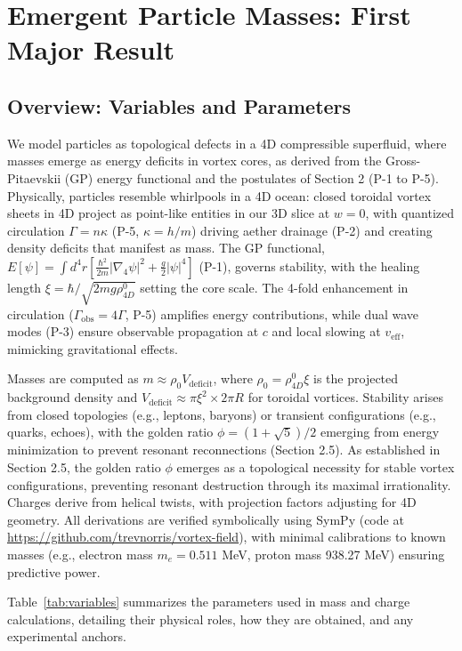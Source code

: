 \section{Emergent Particle Masses: First Major Result}

\subsection{Overview: Variables and Parameters}

We model particles as topological defects in a 4D compressible superfluid, where masses emerge as energy deficits in vortex cores, as derived from the Gross-Pitaevskii (GP) energy functional and the postulates of Section 2 (P-1 to P-5). Physically, particles resemble whirlpools in a 4D ocean: closed toroidal vortex sheets in 4D project as point-like entities in our 3D slice at $w=0$, with quantized circulation $\Gamma = n \kappa$ (P-5, $\kappa = h / m$) driving aether drainage (P-2) and creating density deficits that manifest as mass. The GP functional, $E[\psi] = \int d^4 r \left[ \frac{\hbar^2}{2 m} |\nabla_4 \psi|^2 + \frac{g}{2} |\psi|^4 \right]$ (P-1), governs stability, with the healing length $\xi = \hbar / \sqrt{2 m g \rho_{4D}^0}$ setting the core scale. The 4-fold enhancement in circulation ($\Gamma_{\text{obs}} = 4\Gamma$, P-5) amplifies energy contributions, while dual wave modes (P-3) ensure observable propagation at $c$ and local slowing at $v_{\text{eff}}$, mimicking gravitational effects.

Masses are computed as $m \approx \rho_0 V_{\text{deficit}}$, where $\rho_0 = \rho_{4D}^0 \xi$ is the projected background density and $V_{\text{deficit}} \approx \pi \xi^2 \times 2\pi R$ for toroidal vortices. Stability arises from closed topologies (e.g., leptons, baryons) or transient configurations (e.g., quarks, echoes), with the golden ratio $\phi = (1 + \sqrt{5})/2$ emerging from energy minimization to prevent resonant reconnections (Section 2.5). As established in Section 2.5, the golden ratio $\phi$ emerges as a topological necessity for stable vortex configurations, preventing resonant destruction through its maximal irrationality. Charges derive from helical twists, with projection factors adjusting for 4D geometry. All derivations are verified symbolically using SymPy (code at \url{https://github.com/trevnorris/vortex-field}), with minimal calibrations to known masses (e.g., electron mass $m_e = 0.511$ MeV, proton mass 938.27 MeV) ensuring predictive power.

Table~\ref{tab:variables} summarizes the parameters used in mass and charge calculations, detailing their physical roles, how they are obtained, and any experimental anchors.


